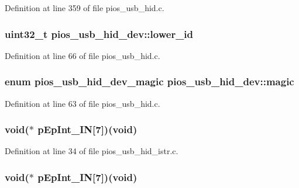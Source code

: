 \-Definition at line 359 of file pios\-\_\-usb\-\_\-hid.\-c.

\hypertarget{group___p_i_o_s___u_s_b___h_i_d_ga088a37cd66d7047583d47a16a3381e4f}{
\subsubsection[{lower\-\_\-id}]{\setlength{\rightskip}{0pt plus 5cm}uint32\-\_\-t {\bf pios\-\_\-usb\-\_\-hid\-\_\-dev\-::lower\-\_\-id}}}\label{group___p_i_o_s___u_s_b___h_i_d_ga088a37cd66d7047583d47a16a3381e4f}


\-Definition at line 66 of file pios\-\_\-usb\-\_\-hid.\-c.

\hypertarget{group___p_i_o_s___u_s_b___h_i_d_ga31a2e7a6eac13138808d37592a55be4e}{
\subsubsection[{magic}]{\setlength{\rightskip}{0pt plus 5cm}enum {\bf pios\-\_\-usb\-\_\-hid\-\_\-dev\-\_\-magic} {\bf pios\-\_\-usb\-\_\-hid\-\_\-dev\-::magic}}}\label{group___p_i_o_s___u_s_b___h_i_d_ga31a2e7a6eac13138808d37592a55be4e}


\-Definition at line 63 of file pios\-\_\-usb\-\_\-hid.\-c.

\hypertarget{group___p_i_o_s___u_s_b___h_i_d_ga0992c19a0f2e317fcd93f755d316a0fd}{
\subsubsection[{p\-Ep\-Int\-\_\-\-I\-N}]{\setlength{\rightskip}{0pt plus 5cm}void($\ast$ {\bf p\-Ep\-Int\-\_\-\-I\-N}\mbox{[}7\mbox{]})(void)}}\label{group___p_i_o_s___u_s_b___h_i_d_ga0992c19a0f2e317fcd93f755d316a0fd}


\-Definition at line 34 of file pios\-\_\-usb\-\_\-hid\-\_\-istr.\-c.

\hypertarget{group___p_i_o_s___u_s_b___h_i_d_ga0992c19a0f2e317fcd93f755d316a0fd}{
\subsubsection[{p\-Ep\-Int\-\_\-\-I\-N}]{\setlength{\rightskip}{0pt plus 5cm}void($\ast$ {\bf p\-Ep\-Int\-\_\-\-I\-N}\mbox{[}7\mbox{]})(void)}}\label{group___p_i_o_s___u_s_b___h_i_d_ga0992c19a0f2e317fcd93f755d316a0fd}


